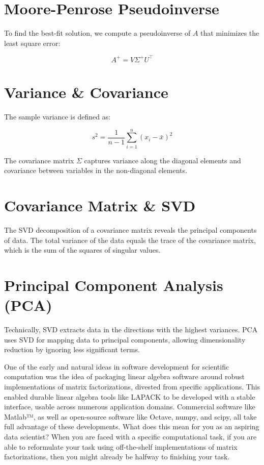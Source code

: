 \documentclass{ximera}
\begin{document}
\begin{problem}
\section{Moore-Penrose Pseudoinverse}
To find the best-fit solution, we compute a pseudoinverse of \(A\) that minimizes the least square error:

\[
A^+ = V \Sigma^+ U^\top
\]

\section{Variance \& Covariance}
The sample variance is defined as:

\[
s^2 = \frac{1}{n-1} \sum_{i=1}^n (x_i - \bar{x})^2
\]

The covariance matrix \(\Sigma\) captures variance along the diagonal elements and covariance between variables in the non-diagonal elements.

\section{Covariance Matrix \& SVD}
The SVD decomposition of a covariance matrix reveals the principal components of data. The total variance of the data equals the trace of the covariance matrix, which is the sum of the squares of singular values.

\section{Principal Component Analysis (PCA)}
Technically, SVD extracts data in the directions with the highest variances. PCA uses SVD for mapping data to principal components, allowing dimensionality reduction by ignoring less significant terms.

One of the early and natural ideas in software development for scientific computation was the idea of packaging linear algebra software around robust implementations of matrix factorizations, divested from specific applications. This enabled durable linear algebra tools like LAPACK to be developed with a stable interface, usable across numerous application domains. Commercial software like Matlab™, as well as open-source software like Octave, numpy, and scipy, all take full advantage of these developments. What does this mean for you as an aspiring data scientist? When you are faced with a specific computational task, if you are able to reformulate your task using off-the-shelf implementations of matrix factorizations, then you might already be halfway to finishing your task.


\end{problem}
\end{document}
